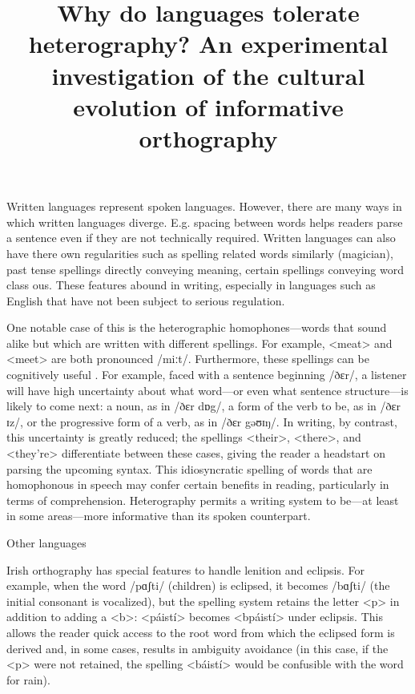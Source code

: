 \documentclass[doc,biblatex]{apa7}
\title{Why do languages tolerate heterography? An experimental investigation of the cultural evolution of informative orthography}
\begin{document}
\maketitle

\noindent
Written languages represent spoken languages. However, there are many ways in which written languages diverge. E.g. spacing between words helps readers parse a sentence even if they are not technically required. Written languages can also have there own regularities such as spelling related words similarly (magician), past tense spellings directly conveying meaning, certain spellings conveying word class ous. These features abound in writing, especially in languages such as English that have not been subject to serious regulation.

One notable case of this is the heterographic homophones---words that sound alike but which are written with different spellings. For example, <meat> and <meet> are both pronounced /miːt/. Furthermore, these spellings can be cognitively useful . For example, faced with a sentence beginning /ðɛr/, a listener will have high uncertainty about what word---or even what sentence structure---is likely to come next: a noun, as in /ðɛr dɒg/, a form of the verb to be, as in /ðɛr ɪz/, or the progressive form of a verb, as in /ðɛr gəʊɪŋ/. In writing, by contrast, this uncertainty is greatly reduced; the spellings <their>, <there>, and <they're> differentiate between these cases, giving the reader a headstart on parsing the upcoming syntax. This idiosyncratic spelling of words that are homophonous in speech may confer certain benefits in reading, particularly in terms of comprehension. Heterography permits a writing system to be---at least in some areas---more informative than its spoken counterpart.

Other languages

Irish orthography has special features to handle lenition and eclipsis. For example, when the word /pɑʃti/ (children) is eclipsed, it becomes /bɑʃti/ (the initial consonant is vocalized), but the spelling system retains the letter <p> in addition to adding a <b>: <páistí> becomes <bpáistí> under eclipsis. This allows the reader quick access to the root word from which the eclipsed form is derived and, in some cases, results in ambiguity avoidance (in this case, if the <p> were not retained, the spelling <báistí> would be confusible with the word for rain).
\end{document}
